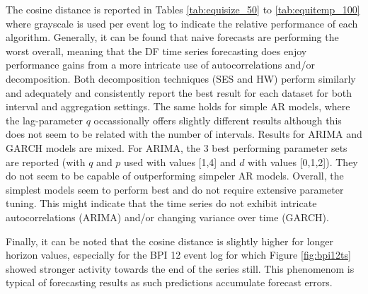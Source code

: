 The cosine distance is reported in Tables \ref{tab:equisize_50} to \ref{tab:equitemp_100} where grayscale is used per event log to indicate the relative performance of each algorithm.
Generally, it can be found that naive forecasts are performing the worst overall, meaning that the DF time series forecasting does enjoy performance gains from a more intricate use of autocorrelations and/or decomposition.
Both decomposition techniques (SES and HW) perform similarly and adequately and consistently report the best result for each dataset for both interval and aggregation settings.
The same holds for simple AR models, where the lag-parameter $q$ occassionally offers slightly different results although this does not seem to be related with the number of intervals.
Results for ARIMA and GARCH models are mixed.
For ARIMA, the 3 best performing parameter sets are reported (with $q$ and $p$ used with values [1,4] and $d$ with values [0,1,2]).
They do not seem to be capable of outperforming simpeler AR models.
Overall, the simplest models seem to perform best and do not require extensive parameter tuning.
This might indicate that the time series do not exhibit intricate autocorrelations (ARIMA) and/or changing variance over time (GARCH). 

Finally, it can be noted that the cosine distance is slightly higher for longer horizon values, especially for the BPI 12 event log for which Figure \ref{fig:bpi12ts} showed stronger activity towards the end of the series still.
This phenomenom is typical of forecasting results as such predictions accumulate forecast errors.




